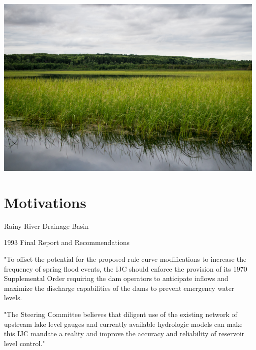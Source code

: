 \documentclass[compress,english]{beamer}
\begin{document}
{\usebackgroundtemplate%
	{\includegraphics[height=\paperheight]{20150804_195914.jpg}}
\section{Motivations}
}

\begin{frame}{Rainy River Drainage Basin}

\begin{center}
\end{center}

\end{frame}


\begin{frame}{1993 Final Report and Recommendations}

"{\color{red}To offset the potential for the proposed rule curve modifications to increase the frequency of spring flood events}, the IJC should enforce the provision of its 1970 Supplemental Order {\color{red} requiring the dam operators to anticipate inflows and maximize the discharge capabilities of the dams to prevent emergency water levels}. 

\vfill

"The Steering Committee believes that {\color{red} diligent use of the existing network of upstream lake level gauges and currently available hydrologic models can make this IJC mandate a reality and improve the accuracy and reliability of reservoir level control}." 

\vfill

\vspace*{3mm}

\end{frame}
\end{document}
